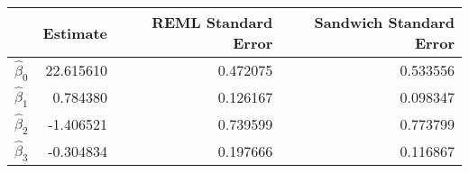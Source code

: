 \begin{tabular}{lrrr}
\toprule
{} &   Estimate &  REML Standard Error &  Sandwich Standard Error \\
\midrule
$\hat\beta_0$ &  22.615610 &             0.472075 &                 0.533556 \\
$\hat\beta_1$ &   0.784380 &             0.126167 &                 0.098347 \\
$\hat\beta_2$ &  -1.406521 &             0.739599 &                 0.773799 \\
$\hat\beta_3$ &  -0.304834 &             0.197666 &                 0.116867 \\
\bottomrule
\end{tabular}
